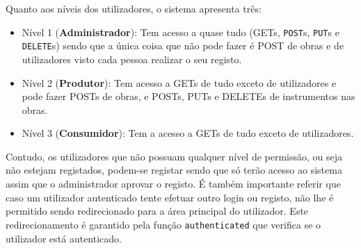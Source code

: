 \bigskip Quanto aos níveis dos utilizadores, o sistema apresenta três:
\begin{itemize}
    \item Nível 1 (\textbf{Administrador}): Tem acesso a quase tudo (GETs, \texttt{POST}s, \texttt{PUT}s e \texttt{DELETE}s) sendo que a única coisa que não pode fazer é POST de obras e de utilizadores visto cada pessoa realizar o seu registo.
    \item Nível 2 (\textbf{Produtor}): Tem acesso a GETs de tudo exceto de utilizadores e pode fazer POSTs de obras, e POSTs, PUTs e DELETEs de instrumentos nas obras.
    \item Nível 3 (\textbf{Consumidor}): Tem a acesso a GETs de tudo exceto de utilizadores.
\end{itemize}

Contudo, os utilizadores que não possuam qualquer nível de permissão, ou seja não estejam registados, podem-se registar sendo que só terão acesso ao sistema assim que o administrador aprovar o registo. É também importante referir que caso um utilizador autenticado tente efetuar outro login ou registo, não lhe é permitido sendo redirecionado para a área principal do utilizador. Este redirecionamento é garantido pela função \texttt{authenticated} que verifica se o utilizador está autenticado.
